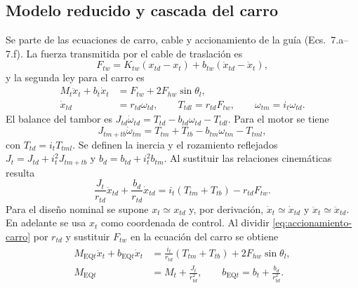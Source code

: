 \documentclass[a4paper,10pt,onecolumn,journal]{ieeeconf}
\numberwithin{equation}{section}
\newcommand{\EQt}{\mathrm{EQ}t}
\begin{document}
\subsection{Modelo reducido y cascada del carro}
	Se parte de las ecuaciones de carro, cable y accionamiento de la guía (Ecs.~7.a--7.f). La fuerza transmitida por el cable de traslación es
	\begin{equation}
		F_{tw}=K_{tw}(x_{td}-x_t)+b_{tw}(\dot x_{td}-\dot x_t),
		\label{eq:cable-carro}
	\end{equation}
	y la segunda ley para el carro es
	\begin{align}
		M_t\ddot x_t+b_t\dot x_t&=F_{tw}+2F_{hw}\sin\theta_l,\\
		\dot x_{td}&=r_{td}\omega_{td},\qquad
		T_{tdl}=r_{td}F_{tw},\qquad \omega_{tm}=i_t\omega_{td}.
	\end{align}
	El balance del tambor es $J_{td}\dot\omega_{td}=T_{td}-b_{td}\omega_{td}-T_{tdl}$. Para el motor se tiene
	\begin{equation}
		J_{tm+tb}\dot\omega_{tm}=T_{tm}+T_{tb}-b_{tm}\omega_{tm}-T_{tml},
	\end{equation}
	con $T_{td}=i_tT_{tml}$. Se definen la inercia y el rozamiento reflejados $J_t=J_{td}+i_t^2J_{tm+tb}$ y $b_d=b_{td}+i_t^2b_{tm}$. Al sustituir las relaciones cinemáticas resulta
	\begin{equation}
		\frac{J_t}{r_{td}}\ddot x_{td}+\frac{b_d}{r_{td}}\dot x_{td}
		=i_t(T_{tm}+T_{tb})-r_{td}F_{tw}.
		\label{eq:accionamiento-carro}
	\end{equation}
	Para el diseño nominal se supone $x_t\simeq x_{td}$ y, por derivación, $\dot x_t\simeq\dot x_{td}$ y $\ddot x_t\simeq\ddot x_{td}$. En adelante se usa $x_t$ como coordenada de control. Al dividir \eqref{eq:accionamiento-carro} por $r_{td}$ y sustituir $F_{tw}$ en la ecuación del carro se obtiene
	\begin{align}
		M_{\EQt}\ddot x_t+b_{\EQt}\dot x_t
		&=\frac{i_t}{r_{td}}(T_{tm}+T_{tb})+2F_{hw}\sin\theta_l,\\
		M_{\EQt}&=M_t+\frac{J_t}{r_{td}^2},\qquad
		b_{\EQt}=b_t+\frac{b_d}{r_{td}^2}.
	\end{align}
\end{document}
